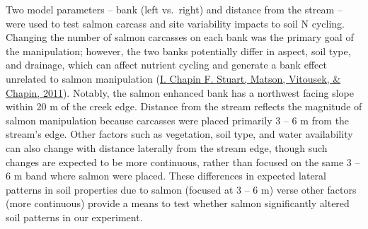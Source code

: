 \documentclass [11pt, proquest] {uwthesis}[2015/03/03]
\begin{document}
Two model parameters -- bank (left vs.~right) and distance from the stream -- were used to test salmon carcass and site variability impacts to soil N cycling. Changing the number of salmon carcasses on each bank was the primary goal of the manipulation; however, the two banks potentially differ in aspect, soil type, and drainage, which can affect nutrient cycling and generate a bank effect unrelated to salmon manipulation (\protect\hyperlink{ref-Chapin2011}{I. Chapin F. Stuart, Matson, Vitousek, \& Chapin, 2011}). Notably, the salmon enhanced bank has a northwest facing slope within 20 m of the creek edge. Distance from the stream reflects the magnitude of salmon manipulation because carcasses were placed primarily 3 -- 6 m from the stream's edge. Other factors such as vegetation, soil type, and water availability can also change with distance laterally from the stream edge, though such changes are expected to be more continuous, rather than focused on the same 3 -- 6 m band where salmon were placed. These differences in expected lateral patterns in soil properties due to salmon (focused at 3 -- 6 m) verse other factors (more continuous) provide a means to test whether salmon significantly altered soil patterns in our experiment.
\end{document}
